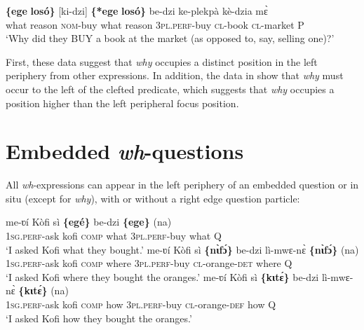 \documentclass[output=paper]{langscibook}
\begin{document}
\ea \label{ex:devlin:pred-clef-why}
\gll \textbf{\{ege} \textbf{los\'{o}\}} [ki-dzi] \textbf{\{*ege} \textbf{los\'{o}\}} be-dzi ke-plekp\`{a} k\`{e}-dzia m\`{ɛ}\\
what reason \textsc{nom}-buy what reason \textsc{3pl.perf}-buy \textsc{cl}-book \textsc{cl}-market P\\
\glt `Why did they BUY a book at the market (as opposed to, say, selling one)?’
\z


First, these data suggest that \textit{why} occupies a distinct position in the left periphery from other expressions. In addition, the data in  show that \textit{why} must occur to the left of the clefted predicate, which suggests that \textit{why} occupies a position higher than the left peripheral focus position.



\section{Embedded \textit{wh}-questions}
All \textit{wh}-expressions can appear in the left periphery of an embedded question or in situ (except for \textit{why}), with or without a right edge question particle:

\ea\label{ex:devlin:embedded}
\begin{xlist}
\ex
\gll me-ʋ\'{i} K\`{o}fi s\`{i} \textbf{\{eg\'{e}\}} be-dzi \textbf{\{ege\}} (na)\\
\textsc{1sg.perf}-ask kofi \textsc{comp} what \textsc{3pl.perf}-buy what Q\\
\glt `I asked Kofi what they bought.'
\ex
\gll me-ʋ\'{i} K\`{o}fi s\`{i} \textbf{\{n\`{ɩ}f\'{ɔ}\}} be-dzi l\`{i}-mwɛ-n\`{ɛ} \textbf{\{n\`{ɩ}f\'{ɔ}\}} (na)\\
\textsc{1sg.perf}-ask kofi \textsc{comp} where \textsc{3pl.perf}-buy \textsc{cl}-orange-\textsc{det}  where Q  \\
\glt `I asked Kofi where they bought the oranges.’
\ex
\gll me-ʋ\'{i} K\`{o}fi s\`{i} \textbf{\{kɩt\'{ɛ}\}} be-dzi l\`{i}-mwɛ-n\`{ɛ} \textbf{\{kɩt\'{ɛ}\}} (na)\\
\textsc{1sg.perf}-ask kofi \textsc{comp} how \textsc{3pl.perf}-buy \textsc{cl}-orange-\textsc{def} how \textsc{Q}  \\
\glt `I asked Kofi how they bought the oranges.’
\end{xlist}
\z
\end{document}
